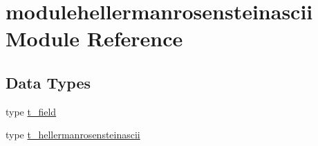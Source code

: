 \hypertarget{namespacemodulehellermanrosensteinascii}{}\section{modulehellermanrosensteinascii Module Reference}
\label{namespacemodulehellermanrosensteinascii}
\subsection*{Data Types}
\begin{DoxyCompactItemize}
\item 
type \mbox{\hyperlink{structmodulehellermanrosensteinascii_1_1t__field}{t\+\_\+field}}
\item 
type \mbox{\hyperlink{structmodulehellermanrosensteinascii_1_1t__hellermanrosensteinascii}{t\+\_\+hellermanrosensteinascii}}
\end{DoxyCompactItemize}
